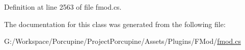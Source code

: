 Definition at line 2563 of file fmod.\+cs.



The documentation for this class was generated from the following file\+:\begin{DoxyCompactItemize}
\item 
G\+:/\+Workspace/\+Porcupine/\+Project\+Porcupine/\+Assets/\+Plugins/\+F\+Mod/\hyperlink{fmod_8cs}{fmod.\+cs}\end{DoxyCompactItemize}

